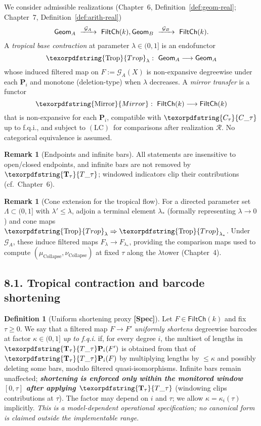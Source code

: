 \documentclass[11pt]{article}
\numberwithin{equation}{section}
\theoremstyle{plain}
\theoremstyle{definition}
\theoremstyle{remark}
\DeclareRobustCommand{\hyp}{\nobreakdash-}
\newcommand{\Rfun}{\mathcal{R}}
\theoremstyle{plain}
\theoremstyle{definition}
\numberwithin{equation}{section}
\theoremstyle{definition}
\newtheorem{definition}[theorem]{Definition}
\newtheorem{remark}[theorem]{Remark}
\DeclareRobustCommand{\FiltCh}[1]{\mathsf{FiltCh}(#1)}
\DeclareRobustCommand{\Ttau}{\texorpdfstring{\ensuremath{\mathbf{T}_{\tau}}}{T\_\tau}}
\DeclareRobustCommand{\Ctau}{\texorpdfstring{\ensuremath{C_{\tau}}}{C\_\tau}}
\DeclareRobustCommand{\LC}{\texorpdfstring{\ensuremath{\mathrm{(LC)}}}{(LC)}}
\DeclareRobustCommand{\Trop}{\texorpdfstring{\ensuremath{\operatorname{Trop}}}{Trop}}
\DeclareRobustCommand{\Mirror}{\texorpdfstring{\ensuremath{\operatorname{Mirror}}}{Mirror}}
\numberwithin{equation}{section}
\theoremstyle{plain}
\theoremstyle{definition}
\theoremstyle{remark}
\providecommand{\Cfun}[1]{\mathsf{C}_{#1}}
\providecommand{\Tfun}[1]{\mathbf{T}_{#1}}
\providecommand{\Ctau}{\Cfun{\tau}}
\providecommand{\Ttau}{\Tfun{\tau}}
\providecommand{\n}{\unskip\space}
\begin{document}
\medskip
We consider admissible realizations (Chapter~6, Definition~\ref{def:geom-real}; Chapter~7, Definition~\ref{def:arith-real})
\[
  \mathsf{Geom}_A\ \xrightarrow{\ \mathcal{G}_A\ }\ \FiltCh{k},\qquad\n  \mathsf{Geom}_B\ \xrightarrow{\ \mathcal{G}_B\ }\ \FiltCh{k}.
\]
A \emph{tropical base contraction} at parameter \(\lambda\in(0,1]\) is an endofunctor
\[
  \Trop_\lambda:\ \mathsf{Geom}_A\longrightarrow \mathsf{Geom}_A
\]
whose induced filtered map on \(F:=\mathcal{G}_A(X)\) is non\hyp expansive degreewise under each \(\mathbf{P}_i\) and monotone (deletion\hyp type) when \(\lambda\) decreases. A \emph{mirror transfer} is a functor
\[
  \Mirror:\ \FiltCh{k}\longrightarrow \FiltCh{k}
\]
that is non\hyp expansive for each \(\mathbf{P}_i\), compatible with \(\Ctau\) up to f.q.i., and subject to \LC\ for comparisons after realization \(\Rfun\). No categorical equivalence is assumed.

\begin{remark}[Endpoints and infinite bars]\label{rk:8-endpoints}
All statements are insensitive to open/closed endpoints, and infinite bars are not removed by \(\Ttau\);
windowed indicators clip their contributions (cf.\ Chapter~6).
\end{remark}

\begin{remark}[Cone extension for the tropical flow]\label{rk:8-cone}
For a directed parameter set \(\Lambda\subset(0,1]\) with \(\lambda'\le \lambda\), adjoin a terminal element \(\lambda_\ast\) (formally representing \(\lambda\to 0\)) and cone maps \(\Trop_{\lambda}\Rightarrow \Trop_{\lambda_\ast}\).
Under \(\mathcal{G}_A\), these induce filtered maps \(F_\lambda\to F_{\lambda_\ast}\), providing the comparison maps used to compute \((\mu_{\mathrm{Collapse}},\nu_{\mathrm{Collapse}})\) at fixed \(\tau\) along the \(\lambda\)\nobreakdash tower (Chapter~4).
\end{remark}

\subsection*{8.1. Tropical contraction and barcode shortening}
\begin{definition}[Uniform shortening proxy \textbf{[Spec]}]\label{def:shorten}
Let \(F\in\FiltCh{k}\) and fix \(\tau\ge 0\).
We say that a filtered map \(F\to F'\) \emph{uniformly shortens} degreewise barcodes at factor \(\kappa\in(0,1]\) \emph{up to f.q.i.} if, for every degree \(i\), the multiset of lengths in \(\Ttau\mathbf{P}_i(F')\) is obtained from that of \(\Ttau\mathbf{P}_i(F)\) by multiplying lengths by \(\le \kappa\) and possibly deleting some bars, modulo filtered quasi\hyp isomorphisms.
Infinite bars remain unaffected; \emph{\textbf{shortening is enforced only within the monitored window \([0,\tau]\) after applying \(\Ttau\)}} (windowing clips contributions at \(\tau\)).
The factor may depend on \(i\) and \(\tau\); we allow \(\kappa=\kappa_i(\tau)\) implicitly.
\emph{This is a model\hyp dependent operational specification; no canonical form is claimed outside the implementable range.}
\end{definition}
\end{document}
